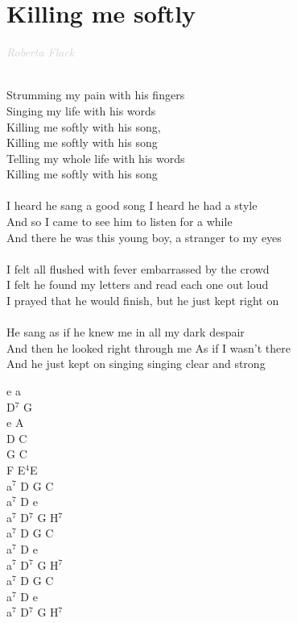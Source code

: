 \documentclass[a5paper, 10pt]{book}
\begin{document}
\section{Killing me softly}\textcolor{lightgray}{\textit{Roberta Flack}}\\~\\
\begin{minipage}[t]{0.75\textwidth}
  \hspace*{5mm}Strumming my pain with his fingers \\
  \hspace*{5mm}Singing my life with his words\\
  \hspace*{5mm}Killing me softly with his song, \\
  \hspace*{5mm}Killing me softly with his song \\
  \hspace*{5mm}Telling my whole life with his words \\
  \hspace*{5mm}Killing me softly with his song\\
  \\
  I heard he sang a good song I heard he had a style\\
  And so I came to see him to listen for a while\\
  And there he was this young boy, a stranger to my eyes\\
  \\
  I felt all flushed with fever embarrassed by the crowd\\
  I felt he found my letters and read each one out loud\\
  I prayed that he would finish, but he just kept right on\\
  \\
  He sang as if he knew me in all my dark despair \\
  And then he looked right through me As if I wasn't there \\
  And he just kept on singing singing clear and strong \\

\end{minipage}
\begin{minipage}[t]{0.25\textwidth}
  e a\\
  D$^7$ G\\
  e A\\
  D C\\
  G C\\
  F E$^4$E\\

  a$^7$ D G C\\
  a$^7$ D e\\
  a$^7$ D$^7$ G H$^7$\\

  a$^7$ D G C\\
  a$^7$ D e\\
  a$^7$ D$^7$ G H$^7$\\

  a$^7$ D G C\\
  a$^7$ D e\\
  a$^7$ D$^7$ G H$^7$\\
\end{minipage}
\end{document}
